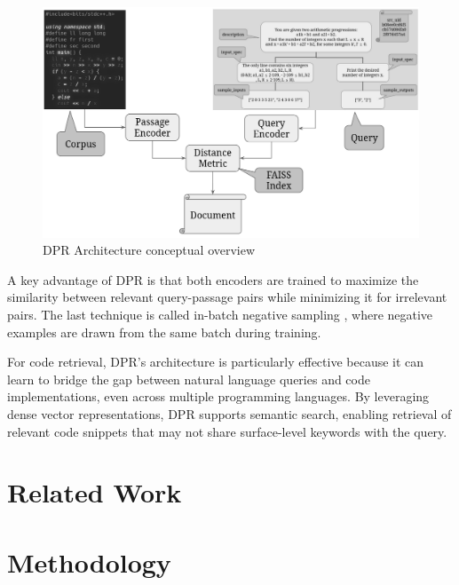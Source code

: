 \documentclass[12pt]{article}
\begin{document}
\begin{figure}[ht]
\centering
\includegraphics[width=1.0\textwidth]{images/dpr-architecture-gray.png}
\caption{DPR Architecture conceptual overview}
\label{fig:dpr-architecture}
\end{figure}

A key advantage of DPR is that both encoders are trained to maximize the similarity between relevant query-passage pairs while minimizing it for irrelevant pairs. The last technique is called in-batch negative sampling \cite{Choi2021}, where negative examples are drawn from the same batch during training.

For code retrieval, DPR's architecture is particularly effective because it can learn to bridge the gap between natural language queries and code implementations, even across multiple programming languages. By leveraging dense vector representations, DPR supports semantic search, enabling retrieval of relevant code snippets that may not share surface-level keywords with the query.

\section{Related Work}



\section{Methodology}


\end{document}
